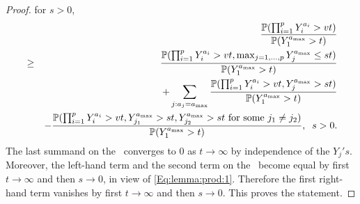 \begin{proof}
for $s>0$,
\begin{eqnarray*}
  && \frac{\P(\prod_{i=1}^pY_i^{a_i}>vt) }{\P(Y_1^{a_{\max}}>t)}  \\
  &\geq&
  \frac{\P(\prod_{i=1}^pY_i^{a_i}>vt, \max_{j=1, \ldots, p}Y_j^{a_{\max}}\leq st) }{\P(Y_1^{a_{\max}}>t)} \\
&&
+ \sum_{j:a_j =a_{\max}} \frac{\P(\prod_{i=1}^pY_i^{a_i}>vt, Y_j^{a_{\max}}>st) }{\P(Y_1^{a_{\max}}>t)}\\
&&
-\frac{\P(\prod_{i=1}^pY_i^{a_i}>vt, Y_{j_1}^{a_{\max}}>st, Y_{j_2}^{a_{\max}}>st \mbox{ for some } j_1\neq j_2) }{\P(Y_1^{a_{\max}}>t)}, \;\; s>0.
\end{eqnarray*} 
The last summand on the \rhs\  
converges to 0 as $t \to \infty$ by independence of the $Y_j's$. Moreover,  the left-hand term and the second term 
on the \rhs\ become equal by first $t \to \infty$ and then $s \to 0$, in view of \eqref{Eq:lemma:prod:1}. Therefore 
the first right-hand term vanishes by first $t \to \infty$ and then $s \to 0$. This proves the statement.
\end{proof}
\ele
